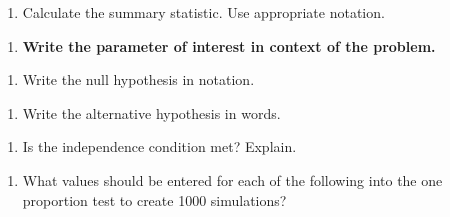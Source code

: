 \documentclass[
]{report}
\providecommand{\tightlist}{%
  \setlength{\itemsep}{0pt}\setlength{\parskip}{0pt}}
\begin{document}
\vspace{0.3in}

\begin{enumerate}
\def\labelenumi{\arabic{enumi}.}
\setcounter{enumi}{1}
\tightlist
\item
  Calculate the summary statistic. Use appropriate notation.
\end{enumerate}

\vspace{0.3in}

\begin{enumerate}
\def\labelenumi{\arabic{enumi}.}
\setcounter{enumi}{2}
\tightlist
\item
  \textbf{Write the parameter of interest in context of the problem.}
\end{enumerate}

\vspace{0.8in}

\begin{enumerate}
\def\labelenumi{\arabic{enumi}.}
\setcounter{enumi}{3}
\tightlist
\item
  Write the null hypothesis in notation.
\end{enumerate}

\vspace{0.3in}

\begin{enumerate}
\def\labelenumi{\arabic{enumi}.}
\setcounter{enumi}{4}
\tightlist
\item
  Write the alternative hypothesis in words.
\end{enumerate}

\vspace{0.8in}

\begin{enumerate}
\def\labelenumi{\arabic{enumi}.}
\setcounter{enumi}{5}
\tightlist
\item
  Is the independence condition met? Explain.
\end{enumerate}

\vspace{0.6in}

\begin{enumerate}
\def\labelenumi{\arabic{enumi}.}
\setcounter{enumi}{6}
\tightlist
\item
  What values should be entered for each of the following into the one proportion test to create 1000 simulations?
\end{enumerate}

\vspace{1mm}
\end{document}
